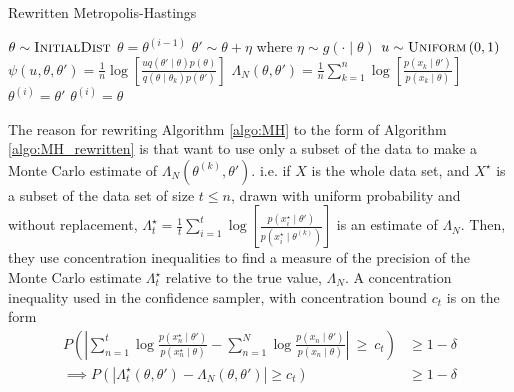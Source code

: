 \begin{algorithm}[H] 
    \caption{Rewritten Metropolis-Hastings}
    \label{algo:MH_rewritten}
    \begin{algorithmic}[1] %
        \State $\theta \sim \textsc{InitialDist}$ 
        \State $\theta = \theta^{\left(i-1\right)}$ 
        \State$\theta' \sim \theta + \eta$ where $\eta\sim g\left(\cdot \mid \theta\right)$
        \State $u\sim \textsc{Uniform}\left(0,1\right)$
        \State $\psi\left(u, \theta, \theta'\right) = \frac{1}{n} \log\left[\frac{u q\left(\theta'\mid \theta \right) p \left(\theta\right)}{q\left(\theta \mid \theta_k \right)p\left(\theta'\right)} \right]$
        \State $\Lambda_N \left(\theta, \theta'\right) = \frac{1}{n} \sum_{k = 1}^n \log \left[\frac{p\left(x_{k}\mid \theta'\right)}{p\left(x_{k}\mid \theta\right)}\right]$
        \State $\theta^{\left(i\right)} = \theta'$
        \Else 
        \State $\theta^{\left(i\right)} = \theta$
         \EndIf
         \EndFor
    \end{algorithmic}
\end{algorithm}
The reason for rewriting Algorithm \ref{algo:MH} to the form of Algorithm \ref{algo:MH_rewritten} is that \cite{Bardenet:2} want to use only a subset of the data to make a Monte Carlo estimate of $\Lambda_N\left(\theta^{\left(k\right)}, \theta'\right)$. 
i.e. if $X$ is the whole data set, and $X^{\star}$ is a subset of the data set of size $t\leq n$, drawn with uniform probability and without replacement, $\Lambda^{\star}_t = \frac{1}{t} \sum_{i = 1}^t \log\left[\frac{p\left(x_i^{\star}\mid \theta'\right)}{p\left(x_i^{\star}\mid \theta^{\left(k\right)}\right)}\right]$ is an estimate of $\Lambda_N$.  Then, they use concentration inequalities to find a measure of the precision of the Monte Carlo estimate $\Lambda_t^{\star}$ relative to the true value,  $\Lambda_N$.
A concentration inequality used in the confidence sampler, with concentration bound $c_t$ is on the form
\begin{equation}\label{eq:concentration}
\begin{split}
    P\left(\left| \sum_{n = 1}^t \log
    \frac{p\left(x_n^{\star}\mid \theta'\right)}{p\left(x_n^{\star}\mid
    \theta\right)} - \sum_{n = 1}^N \log \frac{p\left(x_n\mid\theta'\right)}{p\left(x_n\mid 
    \theta\right)}\right| \:\geq \:c_t\right) &\geq 1 - \delta \\ 
    \implies P\left(\left|\Lambda_t^{\star}\left(\theta, \theta'\right) - \Lambda_N\left(\theta,\theta'\right) \right| 
    \geq c_t \right) &\geq 1 - \delta
\end{split}
\end{equation}
